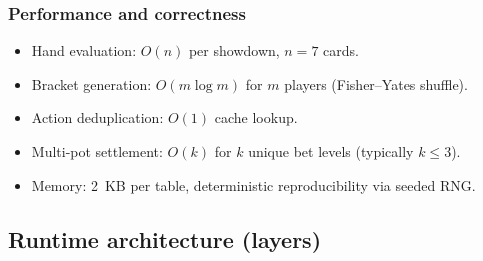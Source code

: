 \documentclass[11pt,a4paper]{article}
\begin{document}
\subsubsection{Performance and correctness}

\begin{itemize}
\item Hand evaluation: $O(n)$ per showdown, $n=7$ cards.
\item Bracket generation: $O(m \log m)$ for $m$ players (Fisher--Yates shuffle).
\item Action deduplication: $O(1)$ cache lookup.
\item Multi-pot settlement: $O(k)$ for $k$ unique bet levels (typically $k\le 3$).
\item Memory: 2~KB per table, deterministic reproducibility via seeded RNG.
\end{itemize}

\subsection{Runtime architecture (layers)}
\end{document}
